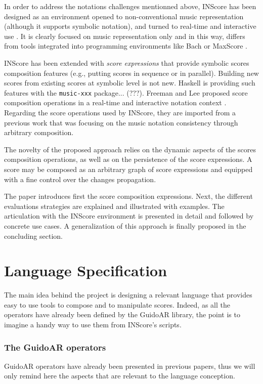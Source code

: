 \documentclass{article}
\newcommand{\sExpr}{\emph{score expressions} }
\begin{document}
In order to address the notations challenges mentionned above, INScore \cite{Fober:12a,fober14c} has been designed as an environment opened to non-conventional music representation (although it supports symbolic notation), and turned to real-time and interactive use \cite{Fober:13b, Fober:14b}. It is clearly focused on music representation only and in this way, differs from tools integrated into programming environments like Bach \cite{agostini12b} or MaxScore \cite{didko08}. 

INScore has been extended with \sExpr that provide symbolic scores composition features (e.g., putting scores in sequence or in parallel). Building new scores from existing scores at symbolic  level is not new. Haskell is providing such features with the \texttt{music-xxx} package... (???). Freeman and Lee proposed score composition operations in a real-time and interactive notation context \cite{Lee:2013}. Regarding the score operations used by INScore, they are imported from a previous work \cite{fober12b} that was focusing on the music notation consistency through arbitrary composition. 

The novelty of the proposed approach relies on the dynamic aspects of the scores composition operations, as well as on the persistence of the score expressions. A score may be composed as an arbitrary graph of score expressions and equipped with a fine control over the changes propagation.

The paper introduces first the score composition expressions. Next, the different evaluations strategies are explained and illustrated with examples. The articulation with the INScore environment is presented in detail and followed by concrete use cases. A generalization of this approach is finally proposed in the concluding section.  


\section{Language Specification}\label{language}

The main idea behind the project is designing a relevant language that provides easy to use tools to compose and to manipulate scores. Indeed, as all the operators have already been defined by the GuidoAR library, the point is to imagine a handy way to use them from INScore's scripts.

\subsubsection{The GuidoAR operators}
GuidoAR operators have already been presented in previous papers, thus we will only remind here the aspects that are relevant to the language conception.
\end{document}
